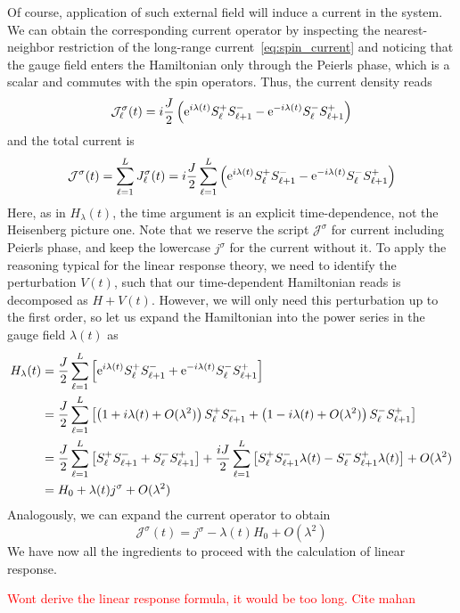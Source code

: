 Of course, application of such external field will induce a current in the system. We can obtain the
corresponding current operator by inspecting the nearest-neighbor restriction of the long-range
current~\eqref{eq:spin_current} and noticing that the gauge field enters the Hamiltonian only through
the Peierls phase, which is a scalar and commutes with the spin operators. Thus, the current density
reads
\begin{equation}
     \mathcal{J}^{\sigma }_{\ell}(t) = i\frac{J}{2} \left( \mathrm{e}^{i \lambda(t)} S^{+}_{\ell} S^{-}_{\ell+1} - \mathrm{e}^{-i \lambda(t)} S^{-}_{\ell}S^{+}_{\ell+1} \right)
\end{equation}
and the total current is 
\begin{equation}
    \mathcal{J}^{\sigma } (t) = \sum_{\ell=1}^{L} J^{\sigma }_{\ell}(t) = i\frac{J}{2} \sum_{\ell=1}^{L} \left( \mathrm{e}^{i \lambda(t)} S^{+}_{\ell} S^{-}_{\ell+1} - \mathrm{e}^{-i \lambda(t)} S^{-}_{\ell}S^{+}_{\ell+1} \right)
    \label{eq:total_current}
\end{equation}
Here, as in \(H_{\lambda }(t)\), the time argument is an explicit time-dependence, not the Heisenberg picture one.
Note that we reserve the script \(\mathcal{J}^{\sigma}\) for current including Peierls phase,
and keep the lowercase \(j^{\sigma }\) for the current without it.
To apply the reasoning typical for the linear response theory, we need to identify the perturbation
\(V(t)\), such that our time-dependent Hamiltonian reads is decomposed as \( H + V(t)\).
However, we will only need this perturbation up to the first order, so let us expand the Hamiltonian into the
power series in the gauge field \(\lambda(t)\) as
\begin{align}
    H_{\lambda }(t) &= \frac{J}{2} \sum_{\ell=1}^{L} \left[\mathrm{e}^{i \lambda(t)} S^{+}_{\ell} S^{-}_{\ell+1}
    + \mathrm{e}^{-i \lambda(t)} S^{-}_{\ell}S^{+}_{\ell+1} \right] \nonumber \\
    &= \frac{J}{2} \sum_{\ell=1}^{L} \left[\left( 1 + i \lambda (t) + O(\lambda ^2) \right)  S^{+}_{\ell} S^{-}_{\ell+1}
    + \left( 1 - i \lambda (t) + O(\lambda ^2) \right) S^{-}_{\ell}S^{+}_{\ell+1} \right] \nonumber \\
    &= \frac{J}{2} \sum_{\ell=1}^{L} \left[ S^{+}_{\ell} S^{-}_{\ell+1} + S^{-}_{\ell}S^{+}_{\ell+1} \right] + 
    \frac{i J}{2} \sum_{\ell=1}^{L} \left[ S^{+}_{\ell} S^{-}_{\ell+1} \lambda (t) - S^{-}_{\ell}S^{+}_{\ell+1} \lambda (t) \right] + O(\lambda ^2) \nonumber \\
    &= H_0 + \lambda(t) j^{\sigma } + O(\lambda ^2)
\end{align}
Analogously, we can expand the current operator to obtain
\begin{equation}
    \mathcal{J}^{\sigma } (t) = j^{\sigma } - \lambda(t) H_0 + O(\lambda ^2)
\end{equation}
We have now all the ingredients to proceed with the calculation of linear response.

\textcolor{red}{Wont derive the linear response formula, it would be too long. Cite mahan}